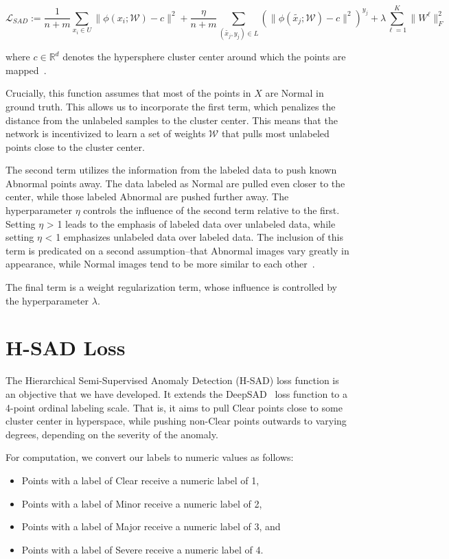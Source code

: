 \documentclass[remotesensing,article,submit,moreauthors]{Definitions/mdpi}
\begin{document}
\[\mathcal{L}_{SAD} := \frac{1}{n + m}\sum_{x_i \in U}{\|\phi(x_i;\mathcal{W}) - c\|^2} + \frac{\eta}{n + m}\sum_{(\tilde{x_j}, y_j) \in L}{(\|\phi(\tilde{x_j};\mathcal{W}) - c\|^{2})^{y_j}} + \lambda\sum_{\ell = 1}^{K}{\|W^{\ell}\|^2_F}\]

where $c \in \mathbb{R}^d$ denotes the hypersphere cluster center around which the points are mapped~\cite{ruff2019deep}.

Crucially, this function assumes that most of the points in $X$ are Normal in ground truth. This allows us to incorporate the first term, which penalizes the distance from the unlabeled samples to the cluster center. This means that the network is incentivized to learn a set of weights $\mathcal{W}$ that pulls most unlabeled points close to the cluster center. 

The second term utilizes the information from the labeled data to push known Abnormal points away. The data labeled as Normal are pulled even closer to the center, while those labeled Abnormal are pushed further away. The hyperparameter $\eta$ controls the influence of the second term relative to the first. Setting $\eta$ > 1 leads to the emphasis of labeled data over unlabeled data, while setting $\eta$ < 1 emphasizes unlabeled data over labeled data. The inclusion of this term is predicated on a second assumption--that Abnormal images vary greatly in appearance, while Normal images tend to be more similar to each other~\cite{ruff2019deep}. 

The final term is a weight regularization term, whose influence is controlled by the hyperparameter $\lambda$.

\section{\ac{H-SAD} Loss}
\label{app:hsad}

The Hierarchical Semi-Supervised Anomaly Detection (\ac{H-SAD}) loss function is an objective that we have developed. It extends the \ac{DeepSAD}~\cite{ruff2019deep} loss function to a 4-point ordinal labeling scale. That is, it aims to pull Clear points close to some cluster center in hyperspace, while pushing non-Clear points outwards to varying degrees, depending on the severity of the anomaly. 

For computation, we convert our labels to numeric values as follows:
\begin{itemize}
\item Points with a label of Clear receive a numeric label of 1,
\item Points with a label of Minor receive a numeric label of 2,
\item Points with a label of Major receive a numeric label of 3, and
\item Points with a label of Severe receive a numeric label of 4.
\end{itemize}
\end{document}
